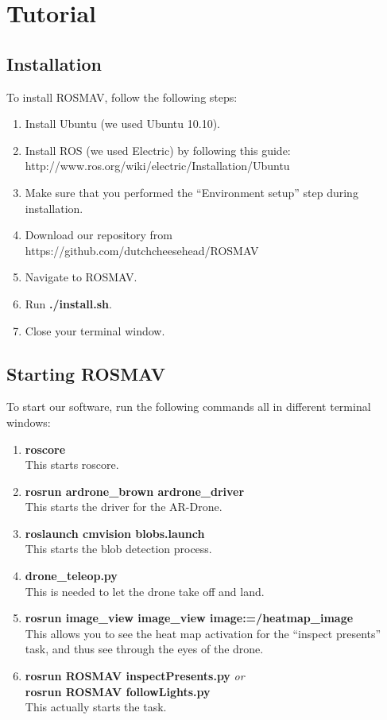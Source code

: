 \documentclass[a4paper,10pt]{article}
\begin{document}
\section{Tutorial}
\subsection{Installation}
To install ROSMAV, follow the following steps:
\begin{enumerate}
\item Install Ubuntu (we used Ubuntu 10.10).

\item Install ROS (we used Electric) by following this guide: \\
      http://www.ros.org/wiki/electric/Installation/Ubuntu

\item Make sure that you performed the ``Environment setup'' step during installation.

\item Download our repository from
      https://github.com/dutchcheesehead/ROSMAV

\item Navigate to ROSMAV.

\item Run \textbf{./install.sh}.
\item Close your terminal window.
\end{enumerate}

\subsection{Starting ROSMAV}
To start our software, run the following commands all in different terminal windows:
\begin{enumerate}
\item \textbf{roscore} \\ This starts roscore.
\item \textbf{rosrun ardrone\_brown ardrone\_driver} \\ This starts the driver for the AR-Drone.
\item \textbf{roslaunch cmvision blobs.launch} \\ This starts the blob detection process.
\item \textbf{drone\_teleop.py} \\ This is needed to let the drone take off and land.
\item \textbf{rosrun image\_view image\_view image:=/heatmap\_image} \\ This
      allows you to see the heat map activation for the ``inspect presents''
      task, and thus see through the eyes of the drone.
\item \textbf{rosrun ROSMAV inspectPresents.py} \textit{or} \\
      \textbf{rosrun ROSMAV followLights.py} \\
      This actually starts the task. 
\end{enumerate}
\end{document}
